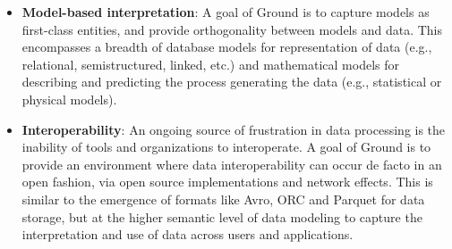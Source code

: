 \documentclass{article}
\begin{document}
\begin{itemize}
\item {\bf Model-based interpretation}:  
A goal of Ground is to capture models as first-class entities, and provide orthogonality between models and data.  This encompasses a breadth of database models for representation of data (e.g., relational, semistructured, linked, etc.) and mathematical models for describing and predicting the process generating the data (e.g., statistical or physical models).

\item {\bf Interoperability}: An ongoing source of frustration in data processing is the inability of tools and organizations to interoperate.
A goal of Ground is to provide an environment where data interoperability can occur de facto in an open  fashion, via open source implementations and network effects.  This is similar to the emergence of formats like Avro, ORC and Parquet for data storage, but at the higher semantic level of data modeling to capture the interpretation and use of data across users and applications.


\end{itemize}
\end{document}
